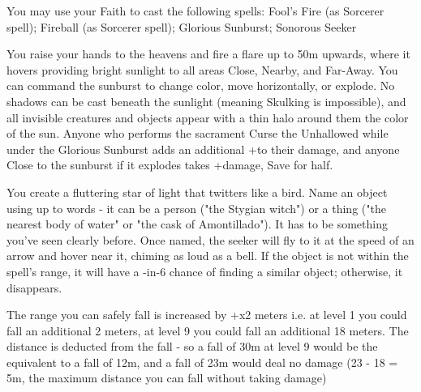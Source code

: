 {You may use your Faith to cast the following spells: Fool's Fire (as Sorcerer spell); Fireball (as Sorcerer spell); Glorious Sunburst; Sonorous Seeker

\LITURGY [
  Name= Glorious Sunburst,
  Link= asura-liturgy-glorious-sunburst,
  Paradigm= Elements ,
  Save=  Y (half) ,
  Duration= Combat or \SUMDICE Minutes ,
  Counter=  n/a  ,
  Keywords= None ,
  Target=   Up to 50m straight up
]



You raise your hands to the heavens and fire a flare up to 50m upwards, where it hovers providing bright sunlight to all areas Close, Nearby, and Far-Away.  You can command the sunburst to change color, move horizontally, or explode.  No shadows can be cast beneath the sunlight (meaning Skulking is impossible), and all invisible creatures and objects appear with a thin halo around them the color of the sun.  Anyone who performs the sacrament Curse the Unhallowed while under the Glorious Sunburst adds an additional +\DICE to their damage, and anyone Close to the sunburst if it explodes takes \SUMDICE+\DICE damage, Save for half.

\LITURGY [
  Name= Sonorous Seeker,
  Link=asura-liturgy-sonorous seeker,
  Paradigm= Prophesy ,
  Save=  N ,
  Duration= \SUMDICE Minutes ,
  Counter=  n/a  ,
  Keywords= None ,
  Target=   Object up to \DICE km away
]



You create a fluttering star of light that twitters like a bird.  Name an object using up to \DICE words - it can be a person ("the Stygian witch") or a thing ("the nearest body of water" or "the cask of Amontillado").  It has to be something you've seen clearly before.  Once named, the seeker will fly to it at the speed of an arrow and hover near it, chiming as loud as a bell.  If the object is not within the spell's range, it will have a \DICE-in-6 chance of finding a similar object; otherwise, it disappears.




\GOD[
Name=Empress Wa,
Link=small-god-empress wa,
GodOf=God of the Heavens,
Holy=a jade diadem
]


The range you can safely fall is increased by +\LVL x2 meters i.e. at level 1 you could fall an additional 2 meters, at level 9 you could fall an additional 18 meters.  The distance is deducted from the fall - so a fall of 30m at level 9 would be the equivalent to a fall of 12m, and a fall of 23m would deal no damage (23 - 18 = 5m, the maximum distance you can fall without taking damage)

}
